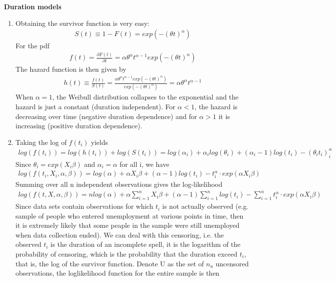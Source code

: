 \begin{Solution}{12.12}
\textbf{Duration models}

\begin{enumerate}
\item Obtaining the survivor function is very easy:
\begin{align*}
  S(t) \equiv 1-F(t) = exp(-(\theta t)^\alpha)
\end{align*}
For the pdf
\begin{align*}
  f(t) = \frac{\partial F(t)}{\partial t} = \alpha \theta^\alpha t^{\alpha-1} exp(-(\theta t)^\alpha)
\end{align*}
The hazard function is then given by
\begin{align*}
h(t) \equiv \frac{f(t)}{S(t)} = \frac{ \alpha \theta^\alpha t^{\alpha-1} exp(-(\theta t)^\alpha)}{exp(-(\theta t)^\alpha)} = \alpha \theta^\alpha t^{\alpha-1}
\end{align*}
When $\alpha=1$, the Weibull distribution collapses to the exponential and the hazard is just a constant (duration independent). For $\alpha<1$, the hazard is decreasing over time (negative duration dependence) and for $\alpha>1$ it is increasing (positive duration dependence).
\item Taking the log of $f(t_i)$ yields
\begin{align*}
  log(f(t_i)) = log\left(h(t_i)\right) + log\left(S(t_i)\right) = log(\alpha_i) +\alpha_i log(\theta_i) + (\alpha_i-1)log(t_i) -(\theta_i t_i)^\alpha_i
\end{align*}
Since $\theta_i = exp(X_i\beta)$ and $\alpha_i=\alpha$ for all i, we have
\begin{align*}
  log(f(t_i,X_i,\alpha,\beta)) = log(\alpha) +\alpha X_i \beta + (\alpha-1)log(t_i) - t_i^\alpha \cdot exp(\alpha X_i \beta)
\end{align*}
Summing over all n independent observations gives the log-likelihood
\begin{align*}
log(f(t,X,\alpha,\beta)) = n log(\alpha) + \alpha \sum_{i=1}^{n} X_i\beta + (\alpha-1) \sum_{i=1}^{n}log(t_i) - \sum_{i=1}^{n} t_i^\alpha \cdot exp(\alpha X_i \beta)
\end{align*}
Since data sets contain observations for which $t_i$ is not actually observed (e.g. sample of people who entered unemployment at various points in time, then it is extremely likely that some peaple in the sample were still unemployed when data collection ended). We can deal with this censoring, i.e. the observed $t_i$ is the duration of an incomplete spell, it is the logarithm of the probability of censoring, which is the probability that the duration exceed $t_i$, that is, the log of the survivor function. Denote U as the set of $n_u$ uncensored observations, the loglikelihood function for the entire sample is then

\end{enumerate}
\end{Solution}
